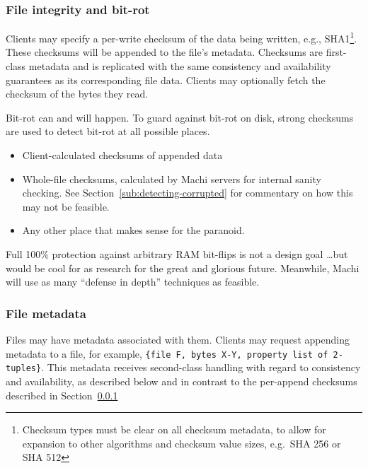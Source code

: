 \documentclass[preprint,10pt]{sigplanconf}
\begin{document}
\subsubsection{File integrity and bit-rot}
\label{sub:bit-rot}

Clients may specify a per-write checksum of the data being written,
e.g., SHA1\footnote{Checksum types must be clear on all checksum
  metadata, to allow for expansion to other algorithms and checksum
  value sizes, e.g.~SHA 256 or SHA 512}.
These checksums will be appended to the file's
metadata.  Checksums are first-class metadata and is replicated with
the same consistency and availability guarantees as its corresponding
file data.
Clients may optionally fetch the checksum of the bytes they
read.

Bit-rot can and will happen.  To guard against bit-rot on disk, strong
  checksums are used to detect bit-rot at all possible places.
\begin{itemize}
    \item Client-calculated checksums of appended data
    \item Whole-file checksums, calculated by Machi servers for internal
      sanity checking.  See Section~\ref{sub:detecting-corrupted} for
      commentary on how this may not be feasible.
    \item Any other place that makes sense for the paranoid.
\end{itemize}

Full 100\% protection against arbitrary RAM bit-flips is not a design
goal \ldots but would be cool for as research for the great and
glorious future.  Meanwhile, Machi will use as many ``defense in
depth'' techniques as feasible.

\subsubsection{File metadata}

Files may have metadata associated with them.
Clients may request appending metadata to a file, for example,
  {\tt \{file F, bytes X-Y, property list of 2-tuples\}}.
This metadata receives second-class handling with regard to
consistency and availability, as described below and in contrast to
the per-append checksums described in Section~\ref{sub:bit-rot}
\end{document}
